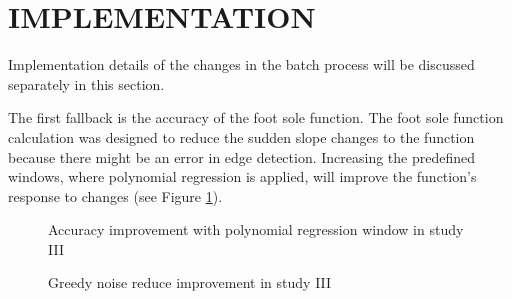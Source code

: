 \section{IMPLEMENTATION}\label{sec:StudyIIIImplementation}

Implementation details of the changes in the batch process will be discussed separately in this section.

The first fallback is the accuracy of the foot sole function. The foot sole function calculation was designed to reduce the sudden slope changes to the function because there might be an error in edge detection. Increasing the predefined windows, where polynomial regression is applied, will improve the function’s response to changes (see Figure \ref{fig:StudyIIIPredefinedWindows}).

\begin{figure}[htbp]
\centering
{}
\caption{Accuracy improvement with polynomial regression window in study III}
\label{fig:StudyIIIPredefinedWindows}
\end{figure}

\begin{figure}[htbp]
\centering
{}
\caption{Greedy noise reduce improvement in study III}
\label{fig:StudyIIINoiseReduce}
\end{figure}

